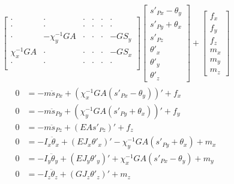 \documentclass[letterpaper,10pt,english]{jupyterBook}
\begin{document}
\begin{equation*}
\begin{split}
\begin{bmatrix}
 \cdot          & \cdot          & \cdot    & \cdot    & \cdot    & \cdot  \\ 
 \cdot          & \cdot          & \cdot    & \cdot    & \cdot    & \cdot  \\ 
 \cdot          &-\chi_y^{-1} GA & \cdot    & \cdot    & \cdot    & -GS_y  \\ 
 \chi_x^{-1} GA & \cdot          & \cdot    & \cdot    & \cdot    & -GS_x  \\ 
 \cdot          & \cdot          & \cdot    & \cdot    & \cdot    & \cdot  \\ 
\end{bmatrix}
\begin{bmatrix}
  s'_{Px} - \theta_y \\
  s'_{Py} + \theta_x \\
  s'_{Pz}            \\
  \theta'_{x}        \\
  \theta'_{y}        \\
  \theta'_{z}          
\end{bmatrix}
+ \begin{bmatrix}
  f_x \\ f_y \\ f_z \\ m_x \\ m_y \\ m_z
\end{bmatrix}
\end{split}
\end{equation*}
\sphinxAtStartPar
{}
\begin{equation*}
\begin{split}\begin{aligned}
  0 & = - m   \ddot{s}_{Px}   + \left( \chi_x^{-1} GA ( s'_{Px} - \theta_y ) \right)'                                         + f_x \\ 
  0 & = - m   \ddot{s}_{Py}   + \left( \chi_y^{-1} GA ( s'_{Py} + \theta_x ) \right)'                                         + f_y \\ 
  0 & = - m   \ddot{s}_{Pz}   + \left( EA s'_{Pz}                            \right)'                                         + f_z \\ 
  0 & = - I_x \ddot{\theta}_x + \left( EJ_x \theta'_x                        \right)' - \chi_y^{-1} GA ( s'_{Py} + \theta_x ) + m_x \\ 
  0 & = - I_y \ddot{\theta}_y + \left( EJ_y \theta'_y                        \right)' + \chi_x^{-1} GA ( s'_{Px} - \theta_y ) + m_y \\ 
  0 & = - I_z \ddot{\theta}_z + \left( GJ_z \theta'_z                        \right)'                                         + m_z \\ 
\end{aligned}\end{split}
\end{equation*}
\sphinxstepscope
\end{document}

